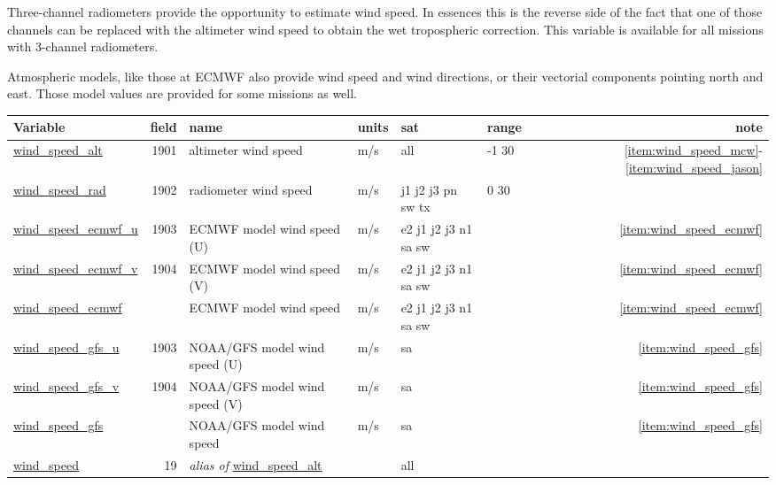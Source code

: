 \documentclass[a4paper,11pt,openany,natbib,nomargin]{thesis}
\makeatletter
\newcommand\var[1]{\url{#1}\index{variables!#1@\protect\url{#1}}}
\newcommand\alias[1]{\emph{alias of} \var{#1}}
\newenvironment{vartable}{
\begin{table}[ht]
\small
\begin{tabular}{lrllllr}
\hline
Variable & field & name & units & sat & range & note \\
\hline
}{
\hline
\end{tabular}
\end{table}
}
\makeatother
\begin{document}
Three-channel radiometers provide the opportunity to estimate wind speed. In essences this is the reverse side of the fact that one of those channels can be replaced with the altimeter wind speed to obtain the wet tropospheric correction. This variable is available for all missions with 3-channel radiometers.

Atmospheric models, like those at ECMWF also provide wind speed and wind directions, or their vectorial components pointing north and east. Those model values are provided for some missions as well.

\begin{vartable}
\var{wind_speed_alt} & 1901 & altimeter wind speed & m/s & all & -1 30 & \ref{item:wind_speed_mcw}-\ref{item:wind_speed_jason} \\
\var{wind_speed_rad} & 1902 & radiometer wind speed & m/s & j1 j2 j3 pn sw tx & 0 30 & \\
\var{wind_speed_ecmwf_u} & 1903 & ECMWF model wind speed (U) & m/s & e2 j1 j2 j3 n1 sa sw & & \ref{item:wind_speed_ecmwf} \\
\var{wind_speed_ecmwf_v} & 1904 & ECMWF model wind speed (V) & m/s & e2 j1 j2 j3 n1 sa sw & & \ref{item:wind_speed_ecmwf} \\
\var{wind_speed_ecmwf} & & ECMWF model wind speed & m/s & e2 j1 j2 j3 n1 sa sw & & \ref{item:wind_speed_ecmwf} \\
\var{wind_speed_gfs_u} & 1903 & NOAA/GFS model wind speed (U) & m/s & sa & & \ref{item:wind_speed_gfs} \\
\var{wind_speed_gfs_v} & 1904 & NOAA/GFS model wind speed (V) & m/s & sa & & \ref{item:wind_speed_gfs} \\
\var{wind_speed_gfs} & & NOAA/GFS model wind speed & m/s & sa & & \ref{item:wind_speed_gfs} \\
\hline
\var{wind_speed} & 19 & \alias{wind_speed_alt} && all && \\
\end{vartable}
\end{document}
